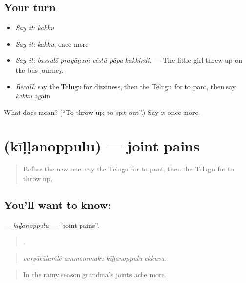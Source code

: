\subsection*{Your turn}
\begin{itemize}
\raggedright
  \item \emph{Say it:} \emph{kakku}
  \item \emph{Say it:} \emph{kakku}, once more
  \item \emph{Say it:} \emph{bassulō prayāṇaṁ cēstū pāpa kakkindi.} — The little girl threw up on the bus journey.
  \item \emph{Recall:} say the Telugu for dizziness, then the Telugu for to pant, then say \emph{kakku} again
\end{itemize}

\begin{tcolorbox}[breakable,colback=teal!4,colframe=teal!35!black,title={Before you move on}]
What does  mean? (\textquotedblleft{}To throw up; to spit out\textquotedblright{}.) Say it once more.
\end{tcolorbox}
\section[\texorpdfstring{\te{కీళ్ళనొప్పులు} (kīḷḷanoppulu)}{కీళ్ళనొప్పులు (kīḷḷanoppulu)}]{ (kīḷḷanoppulu) — joint pains}

\label{lesson:TE-C517-killanoppulu}



\begin{quote}
Before the new one: say the Telugu for to pant, then the Telugu for to throw up.
\end{quote}

\subsection*{You'll want to know: }
\textbf{} — \emph{kīḷḷanoppulu} — \textquotedblleft{}joint pains\textquotedblright{}.

\begin{quote}
   .
\end{quote}

\begin{quote}
\emph{varṣākālaṁlō ammammaku kīḷḷanoppulu ekkuva.}
\end{quote}

\begin{quote}
In the rainy season grandma's joints ache more.
\end{quote}

